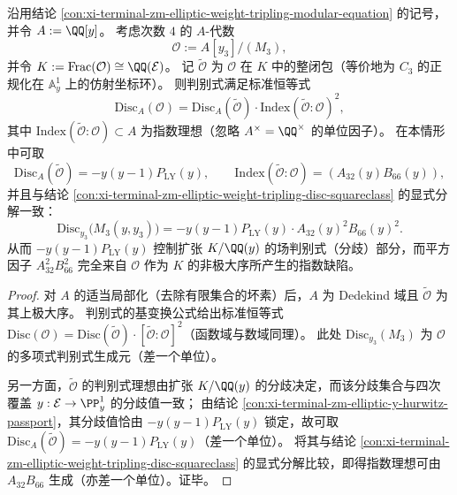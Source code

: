 \begin{proposition}\label{prop:xi-terminal-zm-elliptic-weight-tripling-discriminant-index}
沿用结论 \ref{con:xi-terminal-zm-elliptic-weight-tripling-modular-equation} 的记号，并令 \(A:=\QQ[y]\)。
考虑次数 \(4\) 的 \(A\)-代数
\[
\mathcal O:=A[y_3]/(M_3),
\]
并令 \(K:=\mathrm{Frac}(\mathcal O)\cong \QQ(\mathcal E)\)。
记 \(\widetilde{\mathcal O}\) 为 \(\mathcal O\) 在 \(K\) 中的整闭包（等价地为 \(C_3\) 的正规化在 \(\mathbb A^1_y\) 上的仿射坐标环）。
则判别式满足标准恒等式
\[
\mathrm{Disc}_A(\mathcal O)=\mathrm{Disc}_A(\widetilde{\mathcal O})\cdot \mathrm{Index}(\widetilde{\mathcal O}:\mathcal O)^2,
\]
其中 \(\mathrm{Index}(\widetilde{\mathcal O}:\mathcal O)\subset A\) 为指数理想（忽略 \(A^\times=\QQ^\times\) 的单位因子）。
在本情形中可取
\[
\mathrm{Disc}_A(\widetilde{\mathcal O})=-y(y-1)P_{\mathrm{LY}}(y),
\qquad
\mathrm{Index}(\widetilde{\mathcal O}:\mathcal O)=(A_{32}(y)B_{66}(y)),
\]
并且与结论 \ref{con:xi-terminal-zm-elliptic-weight-tripling-disc-squareclass} 的显式分解一致：
\[
\mathrm{Disc}_{y_3}\bigl(M_3(y,y_3)\bigr)=-y(y-1)P_{\mathrm{LY}}(y)\cdot A_{32}(y)^2B_{66}(y)^2.
\]
从而 \(-y(y-1)P_{\mathrm{LY}}(y)\) 控制扩张 \(K/\QQ(y)\) 的场判别式（分歧）部分，而平方因子 \(A_{32}^2B_{66}^2\) 完全来自 \(\mathcal O\) 作为 \(K\) 的非极大序所产生的指数缺陷。
\end{proposition}
\begin{proof}
对 \(A\) 的适当局部化（去除有限集合的坏素）后，\(A\) 为 Dedekind 域且 \(\widetilde{\mathcal O}\) 为其上极大序。
判别式的基变换公式给出标准恒等式
\(
\mathrm{Disc}(\mathcal O)=\mathrm{Disc}(\widetilde{\mathcal O})\cdot[\widetilde{\mathcal O}:\mathcal O]^2
\)（函数域与数域同理）。
此处 \(\mathrm{Disc}_{y_3}(M_3)\) 为 \(\mathcal O\) 的多项式判别式生成元（差一个单位）。
\par
另一方面，\(\widetilde{\mathcal O}\) 的判别式理想由扩张 \(K/\QQ(y)\) 的分歧决定，而该分歧集合与四次覆盖 \(y:\mathcal E\to\PP^1_y\) 的分歧值一致；
由结论 \ref{con:xi-terminal-zm-elliptic-y-hurwitz-passport}，其分歧值恰由 \(-y(y-1)P_{\mathrm{LY}}(y)\) 锁定，故可取 \(\mathrm{Disc}_A(\widetilde{\mathcal O})=-y(y-1)P_{\mathrm{LY}}(y)\)（差一个单位）。
将其与结论 \ref{con:xi-terminal-zm-elliptic-weight-tripling-disc-squareclass} 的显式分解比较，即得指数理想可由 \(A_{32}B_{66}\) 生成（亦差一个单位）。证毕。
\end{proof}


